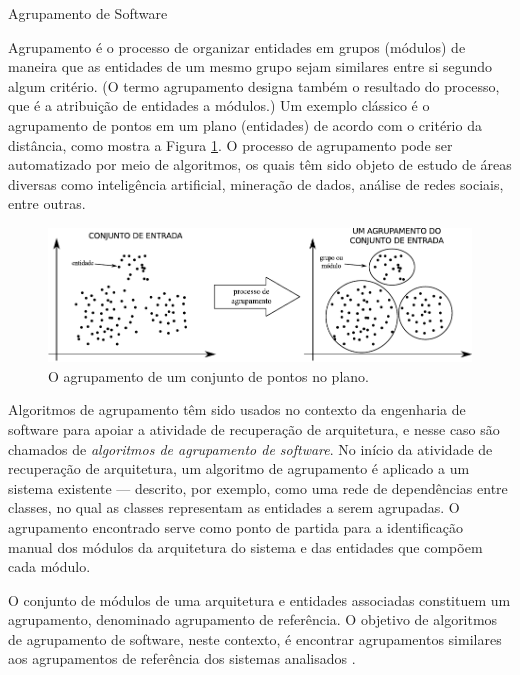 \begin{section}{Agrupamento de Software}
	
Agrupamento é o processo de organizar entidades em grupos (módulos) de maneira que as entidades de um mesmo grupo sejam similares entre si segundo algum critério. (O termo agrupamento designa também o resultado do processo, que é a atribuição de entidades a módulos.) Um exemplo clássico é o agrupamento de pontos em um plano (entidades) de acordo com o critério da distância, como mostra a Figura \ref{fig:agrupamento}. O processo de agrupamento pode ser automatizado por meio de algoritmos, os quais têm sido objeto de estudo de áreas diversas como inteligência artificial, mineração de dados, análise de redes sociais, entre outras.

\begin{figure}[htbp]
	\centering
		\includegraphics[scale=1]{figuras/agrupamento}
	\caption{O agrupamento de um conjunto de pontos no plano.}
	\label{fig:agrupamento}
\end{figure}

Algoritmos de agrupamento têm sido usados no contexto da engenharia de software para apoiar a atividade de recuperação de arquitetura, e nesse caso são chamados de \emph{algoritmos de agrupamento de software}. No início da atividade de recuperação de arquitetura, um algoritmo de agrupamento é aplicado a um sistema existente --- descrito, por exemplo, como uma rede de dependências entre classes, no qual as classes representam as entidades a serem agrupadas. O agrupamento encontrado serve como ponto de partida para a identificação manual dos módulos da arquitetura do sistema e das entidades que compõem cada módulo. 

O conjunto de módulos de uma arquitetura e entidades associadas constituem um agrupamento, denominado agrupamento de referência. O objetivo de algoritmos de agrupamento de software, neste contexto, é encontrar agrupamentos similares aos agrupamentos de referência dos sistemas analisados \cite{Koschke2000}.


\end{section}
